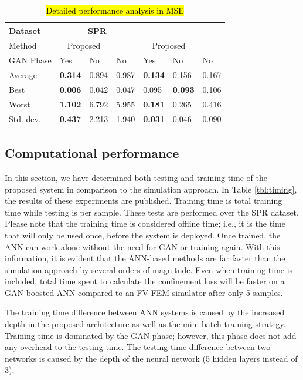 \documentclass[journal]{IEEEtran}
\begin{document}
\begin{table}
	\caption{\hl{Detailed performance analysis in MSE}}
	\centering
	\begin{tabular}{l|l|l|l|l|l|l}
		Dataset & \multicolumn{3}{c|}{SPR} & \multicolumn{3}{c}{\dszero{}} \\\hline
		Method & \multicolumn{2}{c|}{Proposed} & \cite{paper0}  & \multicolumn{2}{c|}{Proposed}   & \cite{paper0} \\\hline
		GAN Phase 			& Yes            & No    &  No     &   Yes            & No             & No    \\\hline
		Average   			& \textbf{0.314} & 0.894 & 0.987   &   \textbf{0.134} & 0.156          & 0.167 \\
		Best      			& \textbf{0.006} & 0.042 & 0.047   &   0.095          & \textbf{0.093} & 0.106 \\
		Worst     			& \textbf{1.102} & 6.792 & 5.955   &   \textbf{0.181} & 0.265          & 0.416 \\
		Std. dev.       	& \textbf{0.437} & 2.213 & 1.940   &   \textbf{0.031} & 0.046          & 0.090 \\
	\end{tabular}
	\label{tbl:all}
\end{table}


\subsection{Computational performance}

In this section, we have determined both testing and training time of the proposed system in comparison to the simulation approach. In Table \ref{tbl:timing}, the results of these experiments are published. Training time is total training time while testing is per sample. These tests are performed over the SPR dataset. Please note that the training time is considered offline time; i.e., it is the time that will only be used once, before the system is deployed. Once trained, the ANN can work alone without the need for GAN or training again. With this information, it is evident that the ANN-based methods are far faster than the simulation approach by several orders of magnitude. Even when training time is included, total time spent to calculate the confinement loss will be faster on a GAN boosted ANN compared to an FV-FEM simulator after only 5 samples.

The training time difference between ANN systems is caused by the increased depth in the proposed architecture as well as the mini-batch training strategy. Training time is dominated by the GAN phase; however, this phase does not add any overhead to the testing time. The testing time difference between two networks is caused by the depth of the neural network (5 hidden layers instead of 3). 
\end{document}
